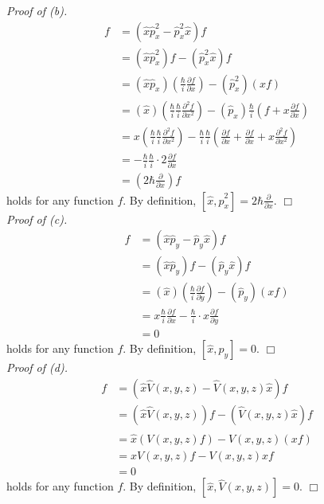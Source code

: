 \documentclass{article}
\begin{document}
\emph{Proof of (b).}
\begin{align*}
[\hat{x}, \hat{p}_x^2]f
&= (\hat{x}\hat{p}_x^2 - \hat{p}_x^2 \hat{x})f \\
&= (\hat{x}\hat{p}_x^2)f - (\hat{p}_x^2 \hat{x})f \\
&= (\hat{x} \hat{p}_x)\left( \frac{\hbar}{i}\frac{\partial f}{\partial x} \right)
  - (\hat{p}_x^2)(xf) \\
&= (\hat{x})\left( \frac{\hbar}{i}\frac{\hbar}{i} \frac{\partial^2 f}{\partial x^2} \right)
  - (\hat{p}_x) \frac{\hbar}{i} \left( f + x \frac{\partial f}{\partial x} \right) \\
&= x \left( \frac{\hbar}{i}\frac{\hbar}{i} \frac{\partial^2 f}{\partial x^2} \right)
  - \frac{\hbar}{i} \frac{\hbar}{i} \left(
    \frac{\partial f}{\partial x} + \frac{\partial f}{\partial x}
  + x \frac{\partial^2 f}{\partial x^2} \right) \\
&= - \frac{\hbar}{i} \frac{\hbar}{i} \cdot 2 \frac{\partial f}{\partial x} \\
&= \left( 2 \hbar \frac{\partial}{\partial x} \right) f
\end{align*}
holds for any function $f$.
By definition,
$[\hat{x}, \hat{p}_x^2] = 2 \hbar \frac{\partial}{\partial x}$.
$\Box$ \\

\emph{Proof of (c).}
\begin{align*}
[\hat{x}, \hat{p}_y]f
&= (\hat{x}\hat{p}_y - \hat{p}_y \hat{x})f \\
&= (\hat{x}\hat{p}_y)f - (\hat{p}_y \hat{x})f \\
&= (\hat{x})\left( \frac{\hbar}{i}\frac{\partial f}{\partial y} \right)
  - (\hat{p}_y)(xf) \\
&= x \frac{\hbar}{i}\frac{\partial f}{\partial x}
  - \frac{\hbar}{i} \cdot x \frac{\partial f}{\partial y} \\
&= 0
\end{align*}
holds for any function $f$.
By definition,
$[\hat{x}, \hat{p}_y] = 0$.
$\Box$ \\

\emph{Proof of (d).}
\begin{align*}
[\hat{x}, \hat{V}(x,y,z)]f
&= (\hat{x}\hat{V}(x,y,z) - \hat{V}(x,y,z) \hat{x})f \\
&= (\hat{x}\hat{V}(x,y,z))f - (\hat{V}(x,y,z) \hat{x})f \\
&= \hat{x}(V(x,y,z)f) - \hat{V}(x,y,z)(xf) \\
&= x V(x,y,z)f - V(x,y,z) xf \\
&= 0
\end{align*}
holds for any function $f$.
By definition,
$[\hat{x}, \hat{V}(x,y,z)] = 0$.
$\Box$ \\
\end{document}
